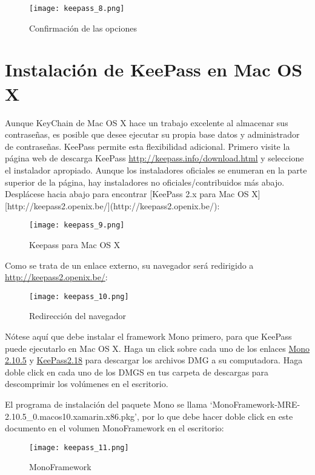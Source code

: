 \documentclass[10pt,a5paper,twoside,,]{book}
\begin{document}
\begin{figure}[htbp]
\centering
\texttt{[image: keepass\_8.png]}
\caption{Confirmación de las opciones}
\end{figure}

\section{Instalación de KeePass en Mac OS
X}\label{instalaciuxf3n-de-keepass-en-mac-os-x}

Aunque KeyChain de Mac OS X hace un trabajo excelente al almacenar sus
contraseñas, es posible que desee ejecutar su propia base datos y
administrador de contraseñas. KeePass permite esta flexibilidad
adicional. Primero visite la página web de descarga KeePass
\url{http://keepass.info/download.html} y seleccione el instalador
apropiado. Aunque los instaladores oficiales se enumeran en la parte
superior de la página, hay instaladores no oficiales/contribuidos más
abajo. Desplácese hacia abajo para encontrar {[}KeePass 2.x para Mac OS
X{]}{[}http://keepass2.openix.be/{]}(http://keepass2.openix.be/):

\begin{figure}[htbp]
\centering
\texttt{[image: keepass\_9.png]}
\caption{Keepass para Mac OS X}
\end{figure}

Como se trata de un enlace externo, su navegador será redirigido a
\url{http://keepass2.openix.be/}:

\begin{figure}[htbp]
\centering
\texttt{[image: keepass\_10.png]}
\caption{Redirección del navegador}
\end{figure}

Nótese aquí que debe instalar el framework Mono primero, para que
KeePass puede ejecutarlo en Mac OS X. Haga un click sobre cada uno de
los enlaces
\href{http://download.mono-project.com/archive/2.10.5/macos-10-x86/0/MonoFramework-MRE-2.10.5_0.macos10.xamarin.x86.dmg}{Mono
2.10.5} y \href{http://keepass2.openix.be/KeePass2.18.dmg}{KeePass2.18}
para descargar los archivos DMG a su computadora. Haga doble click en
cada uno de los DMGS en tus carpeta de descargas para descomprimir los
volúmenes en el escritorio.

El programa de instalación del paquete Mono se llama
`MonoFramework-MRE-2.10.5\_0.macos10.xamarin.x86.pkg', por lo que debe
hacer doble click en este documento en el volumen MonoFramework en el
escritorio:

\begin{figure}[htbp]
\centering
\texttt{[image: keepass\_11.png]}
\caption{MonoFramework}
\end{figure}
\end{document}
